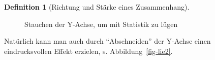 \documentclass[
  a4paper,
  DIV=11]{scrreprt}
\theoremstyle{definition}
\theoremstyle{definition}
\theoremstyle{definition}
\newtheorem{definition}{Definition}[chapter]
\theoremstyle{remark}
\begin{document}
\begin{definition}[Richtung und Stärke eines
Zusammenhang]
\begin{figure}
\begin{minipage}{0.50\linewidth}
{}


\end{minipage}%
%
\begin{minipage}{0.50\linewidth}



\end{minipage}%

\caption{\label{fig-lie1}Stauchen der Y-Achse, um mit Statistik zu
lügen}

\end{figure}%

Natürlich kann man auch durch ``Abschneiden'' der Y-Achse einen
eindrucksvollen Effekt erzielen, s. Abbildung~\ref{fig-lie2}.

\begin{figure}

\begin{minipage}{0.50\linewidth}

\end{minipage}
\end{figure}
\end{definition}
\end{document}
